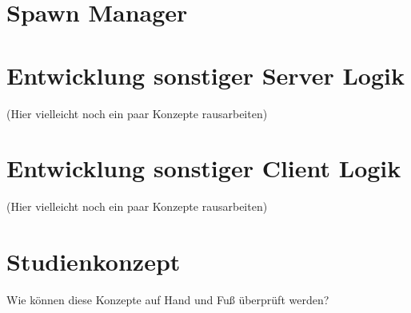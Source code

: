 \section{Spawn Manager}

\section{Entwicklung sonstiger Server Logik}

(Hier vielleicht noch ein paar Konzepte rausarbeiten)

\section{Entwicklung sonstiger Client Logik}

(Hier vielleicht noch ein paar Konzepte rausarbeiten)

\section{Studienkonzept}

Wie können diese Konzepte auf Hand und Fuß überprüft werden?

